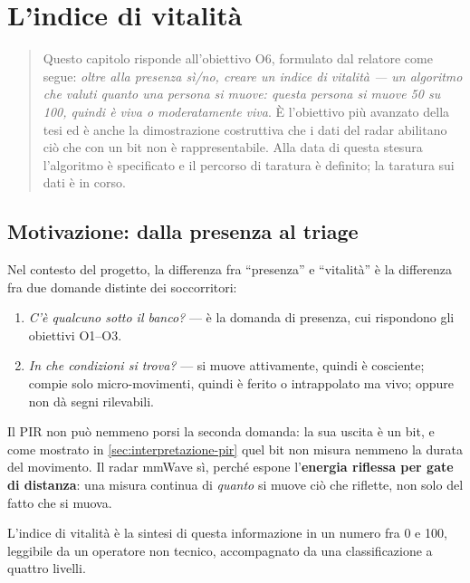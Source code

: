 \chapter{L'indice di vitalità}
\label{cap:vitalita}

\begin{quote}\small
Questo capitolo risponde all'obiettivo O6, formulato dal relatore come segue:
\emph{oltre alla presenza sì/no, creare un indice di vitalità --- un algoritmo che
valuti quanto una persona si muove: questa persona si muove 50 su 100, quindi è viva
o moderatamente viva}. È l'obiettivo più avanzato della tesi ed è anche la
dimostrazione costruttiva che i dati del radar abilitano ciò che con un bit non è
rappresentabile. Alla data di questa stesura l'algoritmo è specificato e il percorso
di taratura è definito; la taratura sui dati è in corso.
\end{quote}

\section{Motivazione: dalla presenza al triage}
\label{sec:vitalita-motivazione}

Nel contesto del progetto, la differenza fra ``presenza'' e ``vitalità'' è la
differenza fra due domande distinte dei soccorritori:

\begin{enumerate}[leftmargin=1.8em,itemsep=2pt]
  \item \emph{C'è qualcuno sotto il banco?} --- è la domanda di presenza, cui
        rispondono gli obiettivi O1--O3.
  \item \emph{In che condizioni si trova?} --- si muove attivamente, quindi è
        cosciente; compie solo micro-movimenti, quindi è ferito o intrappolato ma
        vivo; oppure non dà segni rilevabili.
\end{enumerate}

Il PIR non può nemmeno porsi la seconda domanda: la sua uscita è un bit, e come
mostrato in \cref{sec:interpretazione-pir} quel bit non misura nemmeno la durata del
movimento. Il radar mmWave sì, perché espone l'\textbf{energia riflessa per gate di
distanza}: una misura continua di \emph{quanto} si muove ciò che riflette, non solo
del fatto che si muova.

L'indice di vitalità è la sintesi di questa informazione in un numero fra 0 e 100,
leggibile da un operatore non tecnico, accompagnato da una classificazione a quattro
livelli.

